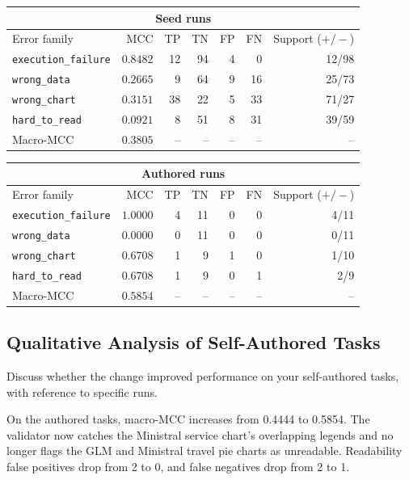 \documentclass[11pt]{article}
\begin{document}
\medskip
\begin{center}
\begin{tabular}{lrrrrrr}
\toprule
\multicolumn{7}{c}{Seed runs} \\
\midrule
Error family & MCC & TP & TN & FP & FN & Support ($+/-$) \\
\midrule
\texttt{execution\_failure} & $0.8482$ & 12 & 94 & 4 & 0 & 12/98 \\
\texttt{wrong\_data} & $0.2665$ & 9 & 64 & 9 & 16 & 25/73 \\
\texttt{wrong\_chart} & $0.3151$ & 38 & 22 & 5 & 33 & 71/27 \\
\texttt{hard\_to\_read} & $0.0921$ & 8 & 51 & 8 & 31 & 39/59 \\
\midrule
Macro-MCC & $0.3805$ & -- & -- & -- & -- & -- \\
\bottomrule
\end{tabular}
\end{center}

\begin{center}
\begin{tabular}{lrrrrrr}
\toprule
\multicolumn{7}{c}{Authored runs} \\
\midrule
Error family & MCC & TP & TN & FP & FN & Support ($+/-$) \\
\midrule
\texttt{execution\_failure} & $1.0000$ & 4 & 11 & 0 & 0 & 4/11 \\
\texttt{wrong\_data} & $0.0000$ & 0 & 11 & 0 & 0 & 0/11 \\
\texttt{wrong\_chart} & $0.6708$ & 1 & 9 & 1 & 0 & 1/10 \\
\texttt{hard\_to\_read} & $0.6708$ & 1 & 9 & 0 & 1 & 2/9 \\
\midrule
Macro-MCC & $0.5854$ & -- & -- & -- & -- & -- \\
\bottomrule
\end{tabular}
\end{center}

\subsection{Qualitative Analysis of Self-Authored Tasks}
Discuss whether the change improved performance on your self-authored tasks,
with reference to specific runs.

\medskip
On the authored tasks, macro-MCC increases from 0.4444 to 0.5854. The validator
now catches the Ministral service chart's overlapping legends and no longer
flags the GLM and Ministral travel pie charts as unreadable. Readability false
positives drop from 2 to 0, and false negatives drop from 2 to 1.
\end{document}
